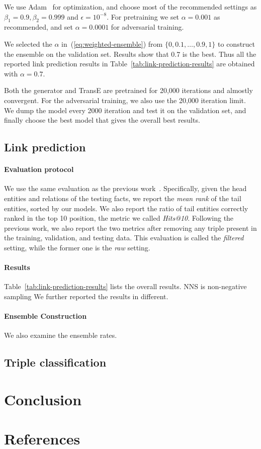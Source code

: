 \documentclass[twocolumn,a4paper,10pt,preprint,3p]{elsarticle}
\begin{document}
We use Adam~\cite{Adam} for optimization, and choose most of the recommended settings as $\beta_1=0.9,\beta_2=0.999$ and $\epsilon=10^{-8}$. For pretraining we set $\alpha=0.001$ as recommended, and set $\alpha=0.0001$ for adversarial training.

We selected the $\alpha$ in~(\ref{eq:weighted-ensemble}) from $ \{0, 0.1, \dots, 0.9, 1\} $ to construct the ensemble on the validation set. Results show that 0.7 is the best. Thus all the reported link prediction results in Table~\ref{tab:link-prediction-results} are obtained with $\alpha=0.7$.

Both the generator and TransE are pretrained for 20,000 iterations and almostly convergent. For the adversarial training, we also use the 20,000 iteration limit. We dump the model every 2000 iteration and test it on the validation set, and finally choose the best model that gives the overall best results.

\subsection{Link prediction}

\paragraph{Evaluation protocol} We use the same evaluation as the previous work~\cite{TransE2013,TransR2015,TransG,TransD}. Specifically, given the head entities and relations of the testing facts, we report the \emph{mean rank} of the tail entities, sorted by our models. We also report the ratio of tail entities correctly ranked in the top 10 position, the metric we called \emph{Hits@10}. Following the previous work, we also report the two metrics after removing any triple present in the training, validation, and testing data. This evaluation is called the \emph{filtered} setting, while the former one is the \emph{raw} setting.

\paragraph{Results} Table~\ref{tab:link-prediction-results} lists the overall results. NNS is non-negative sampling We further reported the results in different.

\paragraph{Ensemble Construction} We also examine the ensemble rates.


\subsection{Triple classification}


\section{Conclusion}

\section*{References}



\end{document}
